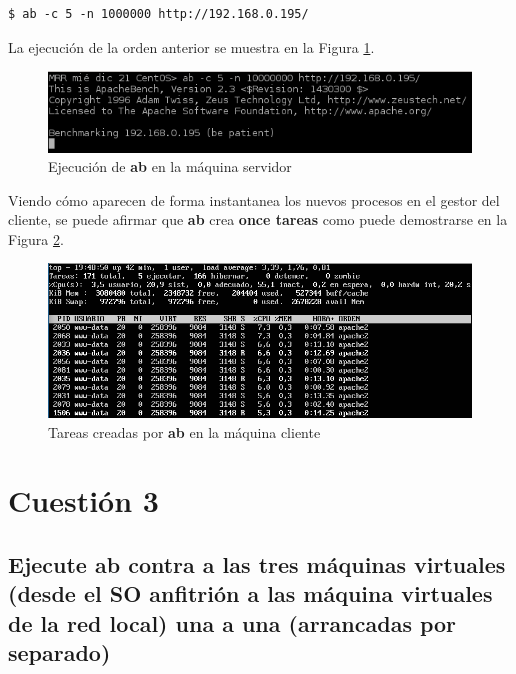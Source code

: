 \begin{lstlisting}[style=fich]
$ ab -c 5 -n 1000000 http://192.168.0.195/
\end{lstlisting}
\vspace{-17pt}
La ejecución de la orden anterior se muestra en la Figura \ref{fig:figura2-4}.
\begin{figure}[H] %
	\centering
	\includegraphics[scale=0.9]{figuras/ejercicio2/figura2-4.png} 
	\caption{Ejecución de \textbf{ab} en la máquina servidor} 
	\label{fig:figura2-4}
\end{figure}
\vspace{-10pt}
Viendo cómo aparecen de forma instantanea los nuevos procesos en el gestor del cliente, se puede afirmar que \textbf{ab} crea \textbf{once tareas} como puede demostrarse en la Figura \ref{fig:figura2-2}.
\begin{figure}[H] %
	\centering
	\includegraphics[scale=0.7]{figuras/ejercicio2/figura2-2.png} 
	\caption{Tareas creadas por \textbf{ab} en la máquina cliente} 
	\label{fig:figura2-2}
\end{figure}
\newpage


\section{Cuestión 3}
\subsection{Ejecute ab contra a las tres máquinas virtuales (desde el SO
	anfitrión a las máquina virtuales de la red local) una a una (arrancadas por
	separado)}

